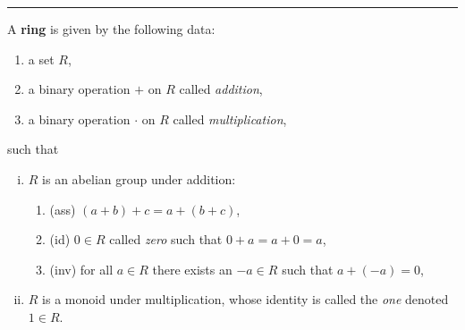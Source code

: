 \documentclass[12pt]{article}
\newcommand{\keyword}[1]{\textbf{#1}}
\newcommand{\sepline}{\rule{\textwidth}{0.4pt}}
\newenvironment{cd}{\begin{center}\begin{tikzcd}}{\end{tikzcd}\end{center}}
\theoremstyle{definition}
\newcommand{\<}{\left\langle}
\renewcommand{\>}{\right\rangle}
\DeclareMathOperator{\id}{id}
\begin{document}

\sepline

A \keyword{ring} is given by the following data:
\begin{enumerate}[(1)]
    \item a set $R$,
    \item a binary operation $+$ on $R$ called \emph{addition},
    \item a binary operation $\cdot$ on $R$ called \emph{multiplication},
\end{enumerate}
such that
\begin{enumerate}[(i)]
    \item $R$ is an abelian group under addition:
    \begin{enumerate}
        \item (ass) $(a + b) + c = a + (b + c)$,
        \item (id) $0 \in R$ called \emph{zero} such that $0 + a = a + 0 = a$,
        \item (inv) for all $a \in R$ there exists an $-a \in R$ such that $a + (-a) = 0$,
    \end{enumerate}
    \item $R$ is a monoid under multiplication, whose identity is called the \emph{one} denoted $1 \in R$.
\end{enumerate}
\end{document}
